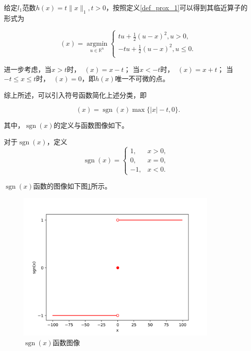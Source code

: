 \begin{solution}
    给定$l_{1}$范数$h(x)=t\|x\|_{1}, t>0$，按照定义\ref{def_prox_1}可以得到其临近算子的形式为

    \begin{equation}
        \mathop{\mathrm{prox_{h}}}(x) = \mathop{\mathrm{argmin}}\limits_{u\in \mathbb{R}^{n}}
        \begin{cases}
            tu + \frac{1}{2}(u-x)^{2}, u>0      ,\\
            -tu + \frac{1}{2}(u-x)^{2}, u\leq 0 .\\
        \end{cases}
    \end{equation}

    进一步考虑，当$x>t$时，$\mathop{\mathrm{prox_{h}}}(x) = x-t$；
    当$x<-t$时，$\mathop{\mathrm{prox_{h}}}(x) = x+t$；
    当$-t\leq x\leq t$时，$\mathop{\mathrm{prox_{h}}}(x) = 0$，即$h(x)$唯一不可微的点。

    综上所述，可以引入符号函数简化上述分类，即
    
    \begin{equation}\label{eq_prox_3}
        \mathop{\mathrm{prox_{h}}}(x) = \mathop{\mathrm{sgn}}(x)\max\{|x|-t, 0\}.
    \end{equation}
    
    其中，$\mathop{\mathrm{sgn}}(x)$的定义与函数图像如下。
    \begin{definition}
        对于$\mathop{\mathrm{sgn}}(x)$，定义
        \begin{equation}
            \mathop{\mathrm{sgn}}(x) = 
            \begin{cases}
                1, &x > 0, \\
                0, &x = 0, \\
                -1, &x < 0.
            \end{cases}
        \end{equation}
    \end{definition}

    $\mathop{\mathrm{sgn}}(x)$函数的图像如下图\ref{figure_sgn}所示。
    \begin{figure}[hbtp]
        \centering
        \includegraphics[width=100mm]{./Figures/sgn_figure.png}
        \caption{$\mathop{\mathrm{sgn}}(x)$函数图像}
        \label{figure_sgn}
    \end{figure}
\end{solution}

